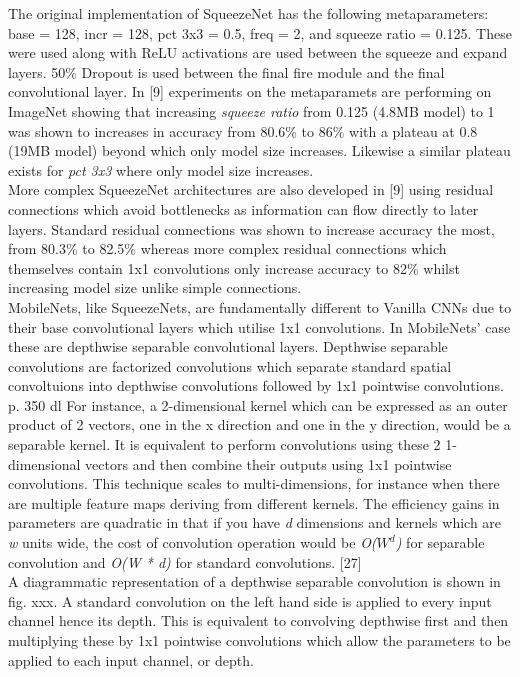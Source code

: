 \documentclass{article}
\begin{document}
The original implementation of SqueezeNet has the following metaparameters: base = 128, incr = 128, pct 3x3 = 0.5, freq = 2, and squeeze ratio = 0.125. These were used along with ReLU activations are used between the squeeze and expand layers. 50\% Dropout is used between the final fire module and the final convolutional layer. In [9] experiments on the metaparamets are performing on ImageNet showing that increasing \emph{squeeze ratio} from 0.125 (4.8MB model) to 1 was shown to increases in accuracy from 80.6\% to 86\% with a plateau at 0.8 (19MB model) beyond which only model size increases. Likewise a similar plateau exists for \emph{pct 3x3} where only model size increases.\\

More complex SqueezeNet architectures are also developed in [9] using residual connections which avoid bottlenecks as information can flow directly to later layers. Standard residual connections was shown to increase accuracy the most, from 80.3\% to 82.5\% whereas more complex residual connections which themselves contain 1x1 convolutions only increase accuracy to 82\% whilst increasing model size unlike simple connections.\\

MobileNets, like SqueezeNets, are fundamentally different to Vanilla CNNs due to their base convolutional layers which utilise 1x1 convolutions. In MobileNets' case these are depthwise separable convolutional layers. Depthwise separable convolutions are factorized convolutions which separate standard spatial convoltuions into depthwise convolutions followed by 1x1 pointwise convolutions.\\

p. 350 dl
For instance, a 2-dimensional kernel which can be expressed as an outer product of 2 vectors, one in the x direction and one in the y direction, would be a separable kernel. It is equivalent to perform convolutions using these 2 1-dimensional vectors and then combine their outputs using 1x1 pointwise convolutions. This technique scales to multi-dimensions, for instance when there are multiple feature maps deriving from different kernels. The efficiency gains in parameters are quadratic in that if you have \emph{d} dimensions and kernels which are \emph{w} units wide, the cost of convolution operation would be \emph{O($W^d$)} for separable convolution and \emph{O(W * d)} for standard convolutions. [27] \\

A diagrammatic representation of a depthwise separable convolution is shown in fig. xxx. A standard convolution on the left hand side is applied to every input channel hence its depth. This is equivalent to convolving depthwise first and then multiplying these by 1x1 pointwise convolutions which allow the parameters to be applied to each input channel, or depth.\\
\end{document}
